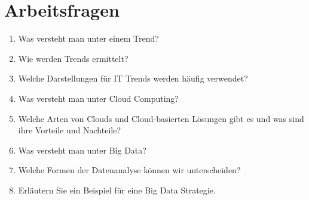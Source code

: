 \section{Arbeitsfragen}
\begin{enumerate}
	\item Was versteht man unter einem Trend?
	\item Wie werden Trends ermittelt?
	\item Welche Darstellungen für IT Trends werden häufig verwendet?
	\item Was versteht man unter Cloud Computing?
	\item Welche Arten von Clouds und Cloud-basierten Lösungen gibt es und was sind ihre Vorteile und Nachteile?
	\item Was versteht man unter Big Data?
	\item Welche Formen der Datenanalyse können wir unterscheiden?
	\item Erläutern Sie ein Beispiel für eine Big Data Strategie.
\end{enumerate}